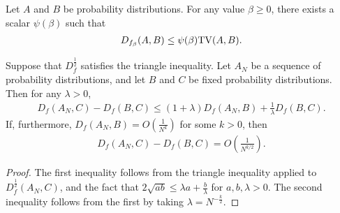 \medskip

\begin{lemma}\label{lemma:f-div-betaleqtv}
Let $A$ and $B$ be probability distributions. For any value $\beta \geq 0$, there exists a scalar $\psi(\beta)$ such that
\begin{align*}
D_{f_\beta}(A,B) \leq \psi(\beta) \mathrm{TV}(A, B).
\end{align*}
\end{lemma}

\medskip


\begin{lemma}\label{lemma:hilbertian-triangle}
Suppose that $D_f^{\frac{1}{2}}$ satisfies the triangle inequality.
Let $A_N$ be a sequence of probability distributions, and let $B$ and $C$ be fixed probability distributions.
Then for any $\lambda>0$,
\begin{align*}
    D_f\left(A_N , C\right) - D_f\left(B , C\right) \leq (1+\lambda) D_f\left(A_N , B \right) +  \frac{1}{\lambda} D_f\left(B , C \right).
\end{align*}
If, furthermore, $D_f\left(A_N , B\right) = O\left( \frac{1}{N^k} \right)$ 
for some $k>0$, 
then
\begin{align*}
	D_f\left(A_N , C\right)  - D_f\left(B , C\right) = O\left( \frac{1}{N^{k/2}} \right).
\end{align*}
\end{lemma}
\begin{proof}
The first inequality follows from the triangle inequality applied to $D_f^{\frac{1}{2}}(A_N, C)$, and the fact that $2\sqrt{ab} \leq \lambda a + \frac{b}{\lambda}$ for ${a, b, \lambda>0}$.
The second inequality follows from the first by taking $\lambda = N^{-\frac{k}{2}}$.
\end{proof}





